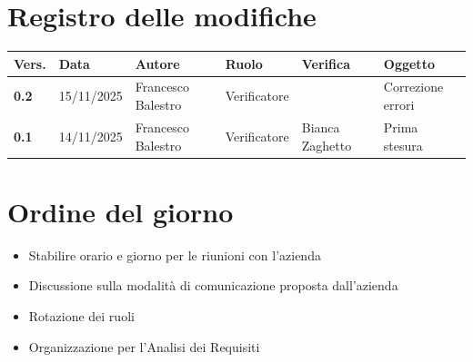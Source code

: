 \documentclass[a4paper,12pt]{article}
\begin{document}
    

    \newpage
    \section*{Registro delle modifiche}

    \begin{table}[h!]
        \begin{tabularx}{\textwidth}{|l|l|l|l|X|X|}
            \hline
            \textbf{Vers.} & \textbf{Data} & \textbf{Autore} & \textbf{Ruolo} & \textbf{Verifica} & \textbf{Oggetto} \\
            \hline
            \textbf{0.2} & 15/11/2025 & Francesco Balestro & Verificatore &  & Correzione errori \\
            \hline
            \textbf{0.1} & 14/11/2025 & Francesco Balestro & Verificatore & Bianca Zaghetto & Prima stesura \\
        \hline
        \end{tabularx}
    \end{table}

    \newpage
    \tableofcontents
    \newpage

    \section{Ordine del giorno} {
        \begin{itemize}
            \item Stabilire orario e giorno per le riunioni con l'azienda
            \item Discussione sulla modalità di comunicazione proposta dall'azienda
            \item Rotazione dei ruoli
            \item Organizzazione per l'Analisi dei Requisiti
        \end{itemize}
    }
\end{document}
